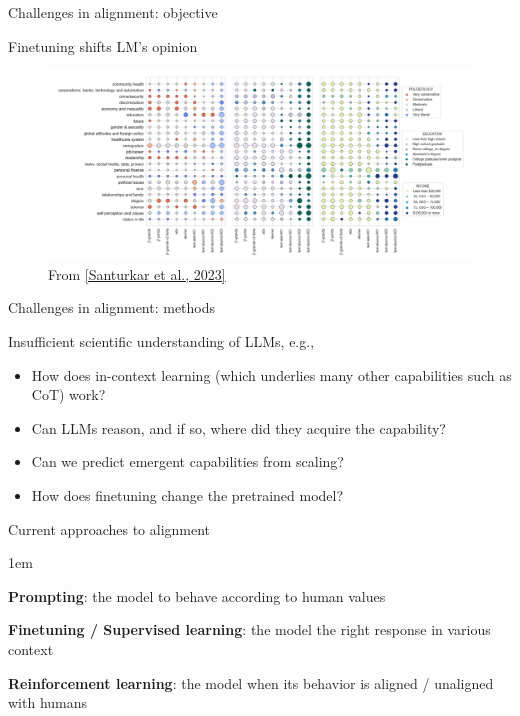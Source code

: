 \documentclass[usenames,dvipsnames,notes,11pt,aspectratio=169,hyperref={colorlinks=true, linkcolor=blue}]{beamer}
\begin{document}
\begin{frame}
    {Challenges in alignment: objective}

    Finetuning shifts LM's opinion
    \vspace{-1.5em}

    \begin{figure}
        \includegraphics[height=0.7\textheight]{figures/opinionqa-result}
        \caption{From \href{https://arxiv.org/pdf/2303.17548.pdf}{[Santurkar et al., 2023]}}
    \end{figure}
\end{frame}


\begin{frame}
    {Challenges in alignment: methods}

    Insufficient scientific understanding of LLMs, e.g., \\
    \begin{itemize}
        \item How does in-context learning (which underlies many other capabilities such as CoT) work?
        \item Can LLMs reason, and if so, where did they acquire the capability?
        \item Can we predict emergent capabilities from scaling?
        \item How does finetuning change the pretrained model?
    \end{itemize}
\end{frame}

\begin{frame}
    {Current approaches to alignment}
    \begin{itemize}
        \itemsep1em
        \item \textbf{Prompting}:  the model to behave according to human values
            \textcolor<2->{fg!20}{
        \item \textbf{Finetuning / Supervised learning}:  the model the right response in various context
        \item \textbf{Reinforcement learning}:  the model when its behavior is aligned / unaligned with humans 
        }
    \end{itemize}
\end{frame}
\end{document}
